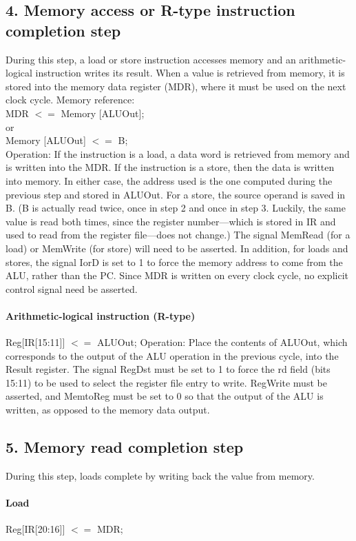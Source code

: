 \documentclass[12pt, a4paper, openany]{book}
\begin{document}
\subsection{4. Memory access or R-type instruction completion step}
During this step, a load or store instruction accesses memory and an arithmetic-logical
instruction writes its result. When a value is retrieved from memory, it is
stored into the memory data register (MDR), where it must be used on the next
clock cycle.
Memory reference:
\\ MDR $ <= $ Memory [ALUOut];
\\ or
\\ Memory [ALUOut] $ <= $ B;
\\ Operation: If the instruction is a load, a data word is retrieved from memory and
is written into the MDR. If the instruction is a store, then the data is written into
memory. In either case, the address used is the one computed during the previous
step and stored in ALUOut. For a store, the source operand is saved in B. (B is
actually read twice, once in step 2 and once in step 3. Luckily, the same value is
read both times, since the register number—which is stored in IR and used to read
from the register file—does not change.) The signal MemRead (for a load) or
MemWrite (for store) will need to be asserted. In addition, for loads and stores,
the signal IorD is set to 1 to force the memory address to come from the ALU,
rather than the PC. Since MDR is written on every clock cycle, no explicit control
signal need be asserted.

\paragraph*{Arithmetic-logical instruction (R-type)}
Reg[IR[15:11]] $<=$ ALUOut;
Operation: Place the contents of ALUOut, which corresponds to the output of the
ALU operation in the previous cycle, into the Result register. The signal RegDst
must be set to 1 to force the rd field (bits 15:11) to be used to select the register file
entry to write. RegWrite must be asserted, and MemtoReg must be set to 0 so that
the output of the ALU is written, as opposed to the memory data output.

\subsection*{5. Memory read completion step}
During this step, loads complete by writing back the value from memory.
\paragraph*{Load}
Reg[IR[20:16]] $ <= $ MDR;
\end{document}
